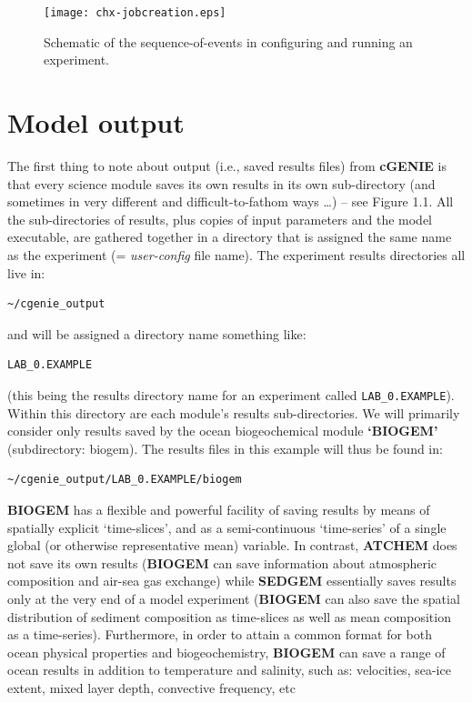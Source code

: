 \documentclass[11pt,fleqn]{book} %
\begin{document}
\begin{figure}
\texttt{[image: chx-jobcreation.eps]}\centering
\vspace{-0mm}
\caption{Schematic of the sequence-of-events in configuring and running an experiment.}
\label{fig:chx-jobcreation}
\end{figure}


\newpage


\section{Model output}

The first thing to note about output (i.e., saved results files) from \textbf{cGENIE} is that every science module saves its own results in its own sub-directory (and sometimes in very different and difficult-to-fathom ways …) – see Figure 1.1. All the sub-directories of results, plus copies of input parameters and the model executable, are gathered together in a directory that is assigned the same name as the experiment (= \textit{user-config} file name). The experiment results directories all live in:
\begin{verbatim}
~/cgenie_output
\end{verbatim}
and will be assigned a directory name something like:
\begin{verbatim}
LAB_0.EXAMPLE
\end{verbatim}
(this being the results directory name for an experiment called \texttt{LAB\_0.EXAMPLE}). Within this directory are each module’s results sub-directories.
We will primarily consider only results saved by the ocean biogeochemical module \textbf{‘BIOGEM’} (subdirectory: biogem). The results files in this example will thus be found in:
\begin{verbatim}
~/cgenie_output/LAB_0.EXAMPLE/biogem
\end{verbatim}
\textbf{BIOGEM} has a flexible and powerful facility of saving results by means of spatially explicit ‘time-slices’, and as a semi-continuous ‘time-series’ of a single global (or otherwise representative mean) variable. In contrast, \textbf{ATCHEM} does not save its own results (\textbf{BIOGEM} can save information about atmospheric composition and air-sea gas exchange) while \textbf{SEDGEM} essentially saves results only at the very end of a model experiment (\textbf{BIOGEM} can also save the spatial distribution of sediment composition as time-slices as well as mean composition as a time-series). Furthermore, in order to attain a common format for both ocean physical properties and biogeochemistry, \textbf{BIOGEM} can save a range of ocean results in addition to temperature and salinity, such as: velocities, sea-ice extent, mixed layer depth, convective frequency, etc
\end{document}
